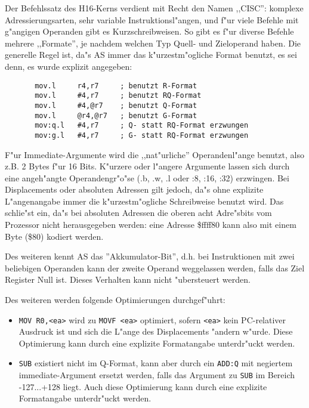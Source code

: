 \documentclass[12pt,a4paper,twoside]{report}
\newcommand{\tty}[1]{{\tt #1}}
\begin{document}
Der Befehlssatz des H16-Kerns verdient mit Recht den Namen ,,CISC'': komplexe
Adressierungsarten, sehr variable Instruktionsl"angen, und f"ur viele
Befehle mit g"angigen Operanden gibt es Kurzschreibweisen.  So gibt
es f"ur diverse Befehle mehrere ,,Formate'', je nachdem welchen Typ Quell-
und Zieloperand haben.  Die generelle Regel ist, da"s AS immer
das k"urzestm"ogliche Format benutzt, es sei denn, es wurde explizit
angegeben:
\begin{verbatim}
       mov.l     r4,r7     ; benutzt R-Format
       mov.l     #4,r7     ; benutzt RQ-Format
       mov.l     #4,@r7    ; benutzt Q-Format
       mov.l     @r4,@r7   ; benutzt G-Format
       mov:q.l   #4,r7     ; Q- statt RQ-Format erzwungen 
       mov:g.l   #4,r7     ; G- statt RQ-Format erzwungen 
\end{verbatim}
F"ur Immediate-Argumente wird die ,,nat"urliche'' Operandenl"ange
benutzt, also z.B. 2 Bytes f"ur 16 Bits.  K"urzere oder l"angere
Argumente lassen sich durch eine angeh"angte Operandengr"o"se
(.b, .w, .l oder :8, :16, :32) erzwingen.  Bei Displacements oder
absoluten Adressen gilt jedoch, da"s ohne explizite L"angenangabe
immer die k"urzestm"ogliche Schreibweise benutzt wird.  Das schlie"st
ein, da"s bei absoluten Adressen die oberen acht Adre"sbits vom
Prozessor nicht herausgegeben werden: eine Adresse \$ffff80 kann also
mit einem Byte (\$80) kodiert werden.

Des weiteren kennt AS das ''Akkumulator-Bit'', d.h. bei Instruktionen
mit zwei beliebigen Operanden kann der zweite Operand weggelassen
werden, falls das Ziel Register Null ist.  Dieses Verhalten kann
nicht "ubersteuert werden.

Des weiteren werden folgende Optimierungen durchgef"uhrt:
\begin{itemize}
\item{\tty{MOV R0,<ea>} wird zu \tty{MOVF <ea>} optimiert, sofern
      \tty{<ea>} kein PC-relativer Ausdruck ist und sich die L"ange
      des Displacements "andern w"urde.  Diese Optimierung kann durch
      eine explizite Formatangabe unterdr"uckt werden.}
\item{\tty{SUB} existiert nicht im Q-Format, kann aber durch ein
      \tty{ADD:Q} mit negiertem immediate-Argument ersetzt werden,
      falls das Argument zu \tty{SUB} im Bereich -127...+128 liegt.
      Auch diese Optimierung kann durch eine explizite Formatangabe
      unterdr"uckt werden.}
\end{itemize}

\end{document}
